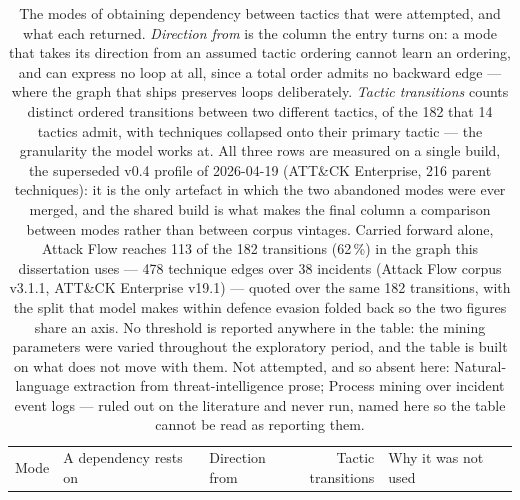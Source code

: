 
\begin{table}[htbp]
\centering
\footnotesize
\setlength{\tabcolsep}{4pt}
\caption[Modes of obtaining tactic dependency that were tried]{The modes of obtaining dependency between tactics that were attempted, and what each returned. \emph{Direction from} is the column the entry turns on: a mode that takes its direction from an assumed tactic ordering cannot learn an ordering, and can express no loop at all, since a total order admits no backward edge --- where the graph that ships preserves loops deliberately. \emph{Tactic transitions} counts distinct ordered transitions between two different tactics, of the 182 that 14 tactics admit, with techniques collapsed onto their primary tactic --- the granularity the model works at. All three rows are measured on a single build, the superseded v0.4 profile of 2026-04-19 (ATT\&CK Enterprise, 216 parent techniques): it is the only artefact in which the two abandoned modes were ever merged, and the shared build is what makes the final column a comparison between modes rather than between corpus vintages. Carried forward alone, Attack Flow reaches 113 of the 182 transitions (62\,\%) in the graph this dissertation uses --- 478 technique edges over 38 incidents (Attack Flow corpus v3.1.1, ATT\&CK Enterprise v19.1) --- quoted over the same 182 transitions, with the split that model makes within defence evasion folded back so the two figures share an axis. No threshold is reported anywhere in the table: the mining parameters were varied throughout the exploratory period, and the table is built on what does not move with them. Not attempted, and so absent here: Natural-language extraction from threat-intelligence prose; Process mining over incident event logs --- ruled out on the literature and never run, named here so the table cannot be read as reporting them.}
\label{tab:preliminary-extraction}
\begin{tabular}{@{}l >{\raggedright\arraybackslash}p{} >{\raggedright\arraybackslash}p{} r >{\raggedright\arraybackslash}p{}@{}}
\toprule
Mode & A dependency rests on & Direction from & \shortstack[r]{Tactic\\transitions} & Why it was not used \\

\end{tabular}
\end{table}
